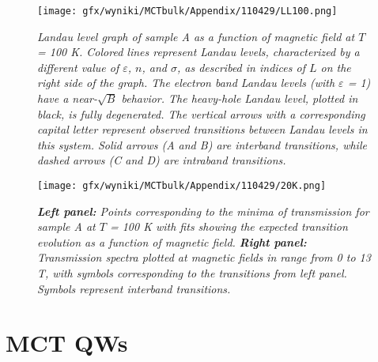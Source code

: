 \documentclass[titlepage,a4paper]{book}
\begin{document}
\begin{figure}[ht]
	\centering
	\texttt{[image: gfx/wyniki/MCTbulk/Appendix/110429/LL100.png]}
	\vspace{-10pt}
	\caption{\textit{Landau level graph of sample A as a function of magnetic field at $T$ = 100 K. Colored lines represent Landau levels, characterized by a different value of $\varepsilon$, $n$, and $\sigma$, as described in indices of $L$ on the right side of the graph. The electron band Landau levels (with $\varepsilon$ = 1) have a near-$\sqrt{B}$ behavior. The heavy-hole Landau level, plotted in black, is fully degenerated. The vertical arrows with a corresponding capital letter represent observed transitions between Landau levels in this system. Solid arrows (A and B) are interband transitions, while dashed arrows (C and D) are intraband transitions.}}
	\label{fig:LL_110429_100K}
\end{figure}
\begin{figure}[ht]
	\centering
	\texttt{[image: gfx/wyniki/MCTbulk/Appendix/110429/20K.png]}
	\vspace{-10pt}
	\caption{\textit{\textbf{Left panel:} Points corresponding to the minima of transmission for sample A at $T$ = 100 K with fits showing the expected transition evolution as a function of magnetic field. \textbf{Right panel:} Transmission spectra plotted at magnetic fields in range from 0 to 13 T, with symbols corresponding to the transitions from left panel. Symbols represent interband transitions.}}
	\label{fig:Spectra_110429_100K}
\end{figure} 



\chapter{MCT QWs}
\label{Appendix_QW}
\end{document}
